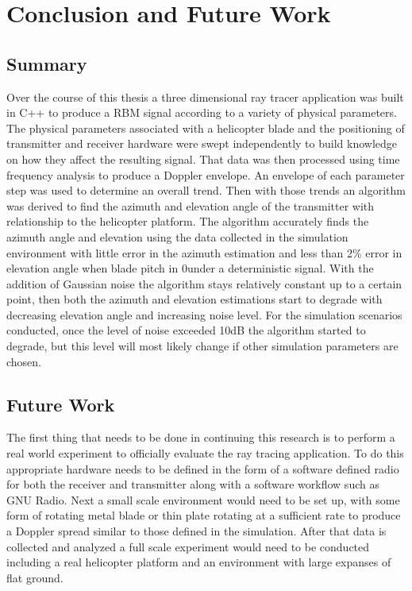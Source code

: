 \chapter{Conclusion and Future Work} \label{ch:conclusion}

\section{Summary}

Over the course of this thesis a three dimensional ray tracer application was built in C++ to produce a RBM signal according to a variety of physical parameters. The physical parameters associated with a helicopter blade and the positioning of transmitter and receiver hardware were swept independently to build knowledge on how they affect the resulting signal. That data was then processed using time frequency analysis to produce a Doppler envelope. An envelope of each parameter step was used to determine an overall trend. Then with those trends an algorithm was derived to find the azimuth and elevation angle of the transmitter with relationship to the helicopter platform. The algorithm accurately finds the azimuth angle and elevation using the data collected in the simulation environment with little error in the azimuth estimation and less than 2\% error in elevation angle when blade pitch in 0\textdegree under a deterministic signal. With the addition of Gaussian noise the algorithm stays relatively constant up to a certain point, then both the azimuth and elevation estimations start to degrade with decreasing elevation angle and increasing noise level. For the simulation scenarios conducted, once the level of noise exceeded 10dB the algorithm started to degrade, but this level will most likely change if other simulation parameters are chosen.

\section{Future Work}
The first thing that needs to be done in continuing this research is to perform a real world experiment to officially evaluate the ray tracing application. To do this appropriate hardware needs to be defined in the form of a software defined radio for both the receiver and transmitter along with a software workflow such as GNU Radio. Next a small scale environment would need to be set up, with some form of rotating metal blade or thin plate rotating at a sufficient rate to produce a Doppler spread similar to those defined in the simulation. After that data is collected and analyzed a full scale experiment would need to be conducted including a real helicopter platform and an environment with large expanses of flat ground.

